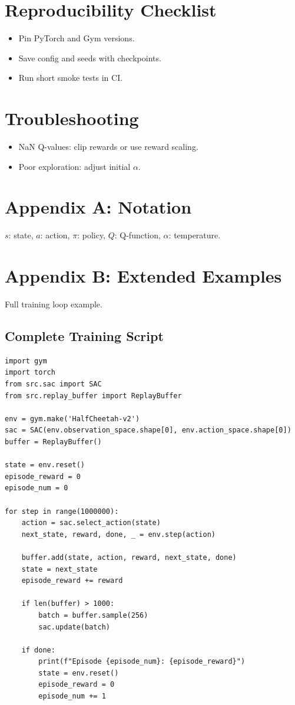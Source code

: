 \documentclass[11pt,a4paper]{article}
\begin{document}
\section{Reproducibility Checklist}
\begin{itemize}
  \item Pin PyTorch and Gym versions.
  \item Save config and seeds with checkpoints.
  \item Run short smoke tests in CI.
\end{itemize}

\section{Troubleshooting}
\begin{itemize}
  \item NaN Q-values: clip rewards or use reward scaling.
  \item Poor exploration: adjust initial $\alpha$.
\end{itemize}

\section{Appendix A: Notation}
$s$: state, $a$: action, $\pi$: policy, $Q$: Q-function, $\alpha$: temperature.

\section{Appendix B: Extended Examples}
Full training loop example.

\subsection{Complete Training Script}
\begin{lstlisting}
import gym
import torch
from src.sac import SAC
from src.replay_buffer import ReplayBuffer

env = gym.make('HalfCheetah-v2')
sac = SAC(env.observation_space.shape[0], env.action_space.shape[0])
buffer = ReplayBuffer()

state = env.reset()
episode_reward = 0
episode_num = 0

for step in range(1000000):
    action = sac.select_action(state)
    next_state, reward, done, _ = env.step(action)
    
    buffer.add(state, action, reward, next_state, done)
    state = next_state
    episode_reward += reward
    
    if len(buffer) > 1000:
        batch = buffer.sample(256)
        sac.update(batch)
    
    if done:
        print(f"Episode {episode_num}: {episode_reward}")
        state = env.reset()
        episode_reward = 0
        episode_num += 1
\end{lstlisting}
\end{document}
